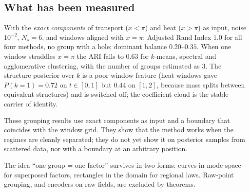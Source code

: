 \subsection{What has been measured}
With the \emph{exact components} of transport ($x<\pi$) and heat ($x>\pi$) as input, noise $10^{-2}$, $N_s=6$, and windows aligned with $x=\pi$: Adjusted Rand Index $1.0$ for all four methods, no group with a hole; dominant balance $0.20$--$0.35$. When one window straddles $x=\pi$ the ARI falls to $0.63$ for $k$-means, spectral and agglomerative clustering, with the number of groups estimated as $3$. The structure posterior over $k$ is a poor window feature (heat windows gave $P(k=1)=0.72$ on $t\in[0,1]$ but $0.44$ on $[1,2]$, because mass splits between equivalent structures) and is switched off; the coefficient cloud is the stable carrier of identity.

\begin{caution}[title=What this does not show]
These grouping results use exact components as input and a boundary that coincides with the window grid. They show that the method works when the regimes are cleanly separated; they do not yet show it on posterior samples from scattered data, nor with a boundary at an arbitrary position.
\end{caution}

\begin{takeaway}
The idea ``one group = one factor'' survives in two forms: curves in mode space for superposed factors, rectangles in the domain for regional laws. Raw-point grouping, and encoders on raw fields, are excluded by theorems.
\end{takeaway}
